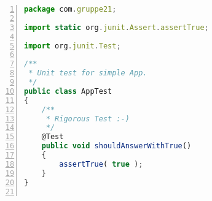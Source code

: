 
\begin{lstlisting}[language=JavaScript,numbers=left]
package com.gruppe21;

import static org.junit.Assert.assertTrue;

import org.junit.Test;

/**
 * Unit test for simple App.
 */
public class AppTest 
{
    /**
     * Rigorous Test :-)
     */
    @Test
    public void shouldAnswerWithTrue()
    {
        assertTrue( true );
    }
}


\end{lstlisting}

